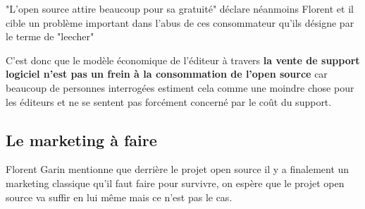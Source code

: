			\newpage

			"L'open source attire beaucoup pour sa gratuité" déclare néanmoins Florent  et il cible un problème important dans l'abus de ces consommateur qu'ils désigne par le terme de "\gls{leecher}"
			\begin{center}
					\textit{
					}
				\end{center}

			C'est donc que le modèle économique de l'éditeur à travers \textbf{la vente de support logiciel n'est pas un frein à la consommation de l'open source} car beaucoup de personnes interrogées estiment cela comme une moindre chose pour les éditeurs et ne se sentent pas forcément concerné par le coût du support.

		\subsection{Le marketing à faire}

			Florent Garin mentionne que derrière le projet open source il y a finalement un marketing classique qu'il faut faire pour survivre, on espère que le projet open source va suffir en lui même mais ce n'est pas le cas.









